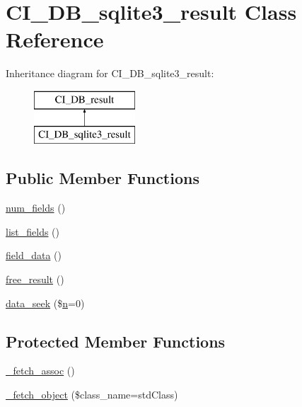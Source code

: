 \hypertarget{class_c_i___d_b__sqlite3__result}{}\section{C\+I\+\_\+\+D\+B\+\_\+sqlite3\+\_\+result Class Reference}
\label{class_c_i___d_b__sqlite3__result}
Inheritance diagram for C\+I\+\_\+\+D\+B\+\_\+sqlite3\+\_\+result\+:\begin{figure}[H]
\begin{center}
\leavevmode
\includegraphics[height=2.000000cm]{class_c_i___d_b__sqlite3__result}
\end{center}
\end{figure}
\subsection*{Public Member Functions}
\begin{DoxyCompactItemize}
\item 
\mbox{\hyperlink{class_c_i___d_b__sqlite3__result_af831bf363e4d7d661a717a4932af449d}{num\+\_\+fields}} ()
\item 
\mbox{\hyperlink{class_c_i___d_b__sqlite3__result_a50b54eb4ea7cfd039740f532988ea776}{list\+\_\+fields}} ()
\item 
\mbox{\hyperlink{class_c_i___d_b__sqlite3__result_a84bffd65e53902ade1591716749a33e3}{field\+\_\+data}} ()
\item 
\mbox{\hyperlink{class_c_i___d_b__sqlite3__result_aad2d98d6beb3d6095405356c6107b473}{free\+\_\+result}} ()
\item 
\mbox{\hyperlink{class_c_i___d_b__sqlite3__result_a8255ae91816e4206e29eb7581c5af0f1}{data\+\_\+seek}} (\$\mbox{\hyperlink{cli_2error__php_8php_a2e6b16bbc42094e4c51ade3c10afdcf1}{n}}=0)
\end{DoxyCompactItemize}
\subsection*{Protected Member Functions}
\begin{DoxyCompactItemize}
\item 
\mbox{\hyperlink{class_c_i___d_b__sqlite3__result_a43a9a92817f1334a1c10752ec44275a0}{\+\_\+fetch\+\_\+assoc}} ()
\item 
\mbox{\hyperlink{class_c_i___d_b__sqlite3__result_a60806be6a9c2488820813c2a7f4fef71}{\+\_\+fetch\+\_\+object}} (\$class\+\_\+name=\textquotesingle{}std\+Class\textquotesingle{})
\end{DoxyCompactItemize}
